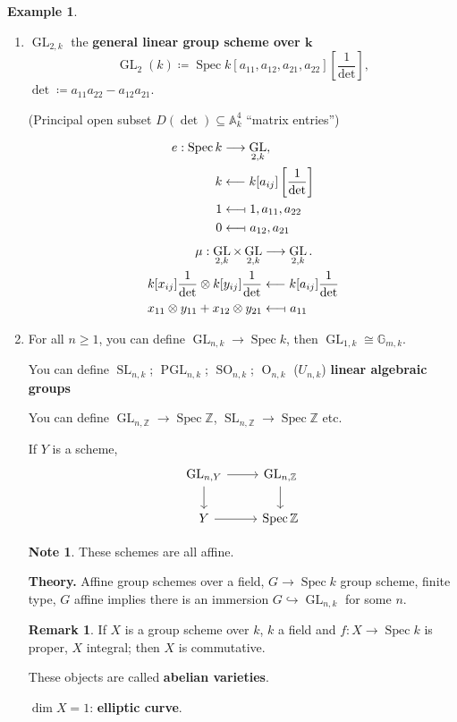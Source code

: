 \documentclass[12pt]{article}
\DeclareMathOperator{\Spec}{Spec}
\DeclareMathOperator{\GL}{GL}
\DeclareMathOperator{\SL}{SL}
\DeclareMathOperator{\PGL}{PGL}
\DeclareMathOperator{\SO}{SO}
\DeclareMathOperator{\OG}{O}
\theoremstyle{definition}
\newtheorem*{remark}{Remark}
\newtheorem*{note}{Note}
\newtheorem*{example}{Example}
\begin{document}
\begin{example}
\begin{enumerate}[label=\arabic*)]
\item $\GL_{2,k}$ the \textbf{general linear group scheme over $\boldsymbol{k}$}
\[\GL_2(k)\coloneqq\Spec k[a_{11},a_{12},a_{21},a_{22}]\left[\frac{1}{\det}\right],\]
$\det\coloneqq a_{11}a_{22}-a_{12}a_{21}$.

(Principal open subset $D(\det)\subseteq\mathbb{A}_k^4$ ``matrix entries'')

\begin{align*}
e:\Spec k&\longrightarrow \GL_{2,k},\\
k&\longleftarrow k[a_{ij}]\left[\frac{1}{\det}\right]\\
1&\longleftarrow\!\shortmid1,a_{11},a_{22}\\
0&\longleftarrow\!\shortmid a_{12},a_{21}
\end{align*}
\begin{align*}
\mu:\GL_{2,k}\times\GL_{2,k}&\longrightarrow\GL_{2,k}.\\
k[x_{ij}]\frac{1}{\det}\otimes k[y_{ij}]\frac{1}{\det}&\longleftarrow k[a_{ij}]\frac{1}{\det}\\
x_{11}\otimes y_{11}+x_{12}\otimes y_{21}&\longleftarrow\!\shortmid a_{11}
\end{align*}

\item For all $n\geq1$, you can define $\GL_{n,k}\rightarrow\Spec k$, then $\GL_{1,k}\cong\mathbb{G}_{m,k}$.

You can define $\SL_{n,k}$; $\PGL_{n,k}$; $\SO_{n,k}$; $\OG_{n,k}$ ($U_{n,k}$) \textbf{linear algebraic groups}

You can define $\GL_{n,\mathbb{Z}}\rightarrow\Spec\mathbb{Z}$, $\SL_{n,\mathbb{Z}}\rightarrow\Spec\mathbb{Z}$ etc.

If $Y$ is a scheme,
\[
\begin{tikzcd}
\GL_{n,Y}\arrow[r]\arrow[d]&\GL_{n,\mathbb{Z}}\arrow[d]\\
Y\arrow[r]&\Spec\mathbb{Z}
\end{tikzcd}
\]

\begin{note}
These schemes are all affine.
\end{note}

\textbf{Theory.} Affine group schemes over a field, $G\rightarrow\Spec k$ group scheme, finite type, $G$ affine implies there is an immersion $G\hookrightarrow\GL_{n,k}$ for some $n$.

\begin{remark}
If $X$ is a group scheme over $k$, $k$ a field and $f:X\rightarrow\Spec k$ is proper, $X$ integral; then $X$ is commutative.

These objects are called \textbf{abelian varieties}.

$\dim X=1$: \textbf{elliptic curve}.
\end{remark}
\end{enumerate}
\end{example}
\end{document}
